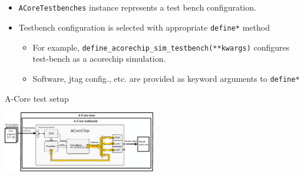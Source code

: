 \documentclass{sdkslides}
\begin{document}
\subsection*{\sectionname}
\begin{frame}[t,fragile]
    \frametitle{\sectionname}
    \begin{itemize}
        \item \verb|ACoreTestbenches| instance represents a test bench
            configuration.
        \item Testbench configuration is selected with appropriate
            \verb|define*|
            method
        \begin{itemize}
            \item For example, \verb|define_acorechip_sim_testbench(**kwargs)|
                configures test-bench as a acorechip simulation.
            \item Software, jtag config., etc. are provided as keyword
                arguments to \verb|define*|
        \end{itemize}
    \end{itemize}
    \begin{block}{A-Core test setup}
        \begin{center}
            \includegraphics[width=0.5\textwidth]{./Pics/A-Core_testsetup.eps}
        \end{center}
    \end{block}
\end{frame}

\renewcommand{\sectionname}{ACoreTestbenches}
\end{document}
